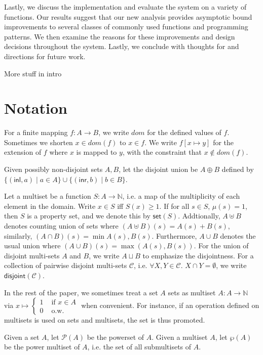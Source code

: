 \documentclass{easychair}
\newcommand{\ms}[1]{\ensuremath{\mathsf{#1}}}
\newcommand{\dist}[1]{\mathsf{disjoint}(#1)}
\newcommand{\jan}[1]{{\color{red} #1}}
\theoremstyle{definition}
\begin{document}
Lastly, we discuss the implementation and evaluate the system on a variety of functions. Our 
results suggest that our new analysis provides asymptotic bound improvements to several classes 
of commonly used functions and programming patterns. We then examine the reasons for these 
improvements and design decisions throughout the system. Lastly, we conclude with thoughts for 
 and directions for future work. 

\jan{More stuff in intro}

\iffalse
\section{Notation}
\label{sect:notation}
For a finite mapping $f : A \to B$, we write $dom$ for the defined values of $f$. Sometimes we shorten $x \in dom(f)$ to $x \in f$. We write $f[x \mapsto y]$ for the extension of $f$ where $x$ is mapped to $y$, with the constraint that $x \notin dom(f)$. 

Given possibly non-disjoint sets $A,B$, let the disjoint union be $A \oplus B$ defined by 
$\{(\ms{inl},a) \mid a \in A\} \cup \{(\ms{inr},b) \mid b \in B\}$.

Let a multiset be a function $S : A \to \mathbb{N}$, i.e. a map of the multiplicity of each element in the domain.  Write $x \in S$ iff $S(x) \ge 1$. If for all  $s \in S$, $\mu(s) = 1$, then $S$ 
is a property set, and we denote this by $\ms{set}(S)$. Addtionally, $A \uplus B$ denotes 
counting union of sets where $(A \uplus B) (s) = A (s) + B(s)$, similarly, 
$(A \cap B)(s) = \min{A(s),B(s)}$. Furthermore, $A \cup B$ denotes the usual union where 
$(A \cup B)(s) = \max{(A(s),B(s))}$.  For the union of disjoint multi-sets $A$ and $B$, 
we write $A \sqcup B$ to emphasize the disjointness.  For a collection of pairwise disjoint 
multi-sets $\mathcal{C}$, i.e. $\forall X,Y \in \mathcal{C}$. $X \cap Y = \emptyset$, we write $\dist{\mathcal{C}}$.

In the rest of the paper, 
we sometimes treat a set $A$ sets as multiset $A : A \to \mathbb{N}$ via 
$x \mapsto \begin{cases} 1 &\text{ if } x \in A \\0 &\text{ o.w.}\end{cases}$ when convenient. 
For instance, if an operation defined on multisets is used on sets and multisets, the set 
is thus promoted.

Given a set $A$, let $\mathcal{P}(A)$ be the powerset of $A$. Given a multiset $A$, let 
$\wp(A)$ be the power multiset of $A$, i.e. the set of all submultisets of $A$.
\end{document}
